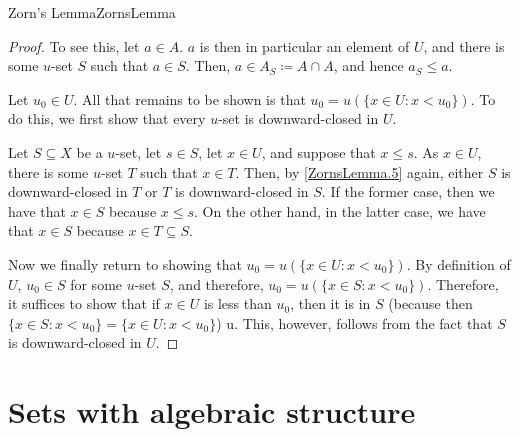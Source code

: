 \begin{thm}{Zorn's Lemma}{ZornsLemma}
\begin{proof}
To see this, let $a\in A$.  $a$ is then in particular an element of $U$, and there is some $u$-set $S$ such that $a\in S$.  Then, $a\in A_S\coloneqq A\cap A$, and hence $a_S\leq a$.

Let $u_0\in U$.  All that remains to be shown is that $u_0=u\left( \{ x\in U:x<u_0\} \right)$.  To do this, we first show  that every $u$-set is downward-closed in $U$.

Let $S\subseteq X$ be a $u$-set, let $s\in S$, let $x\in U$, and suppose that $x\leq s$.  As $x\in U$, there is some $u$-set $T$ such that $x\in T$.  Then, by \cref{ZornsLemma.5} again, either $S$ is downward-closed in $T$ or $T$ is downward-closed in $S$.  If the former case, then we have that $x\in S$ because $x\leq s$.  On the other hand, in the latter case, we have that $x\in S$ because $x\in T\subseteq S$.

Now we finally return to showing that $u_0=u\left( \{ x\in U:x<u_0\} \right)$.  By definition of $U$, $u_0\in S$ for some $u$-set $S$, and therefore, $u_0=u\left( \{ x\in S:x<u_0\} \right)$.  Therefore, it suffices to show that if $x\in U$ is less than $u_0$, then it is in $S$ (because then $\{ x\in S:x<u_0\} =\{ x\in U:x<u_0\}$)
u.  This, however, follows from the fact that $S$ is downward-closed in $U$.
\end{proof}
\end{thm}

\section{Sets with algebraic structure}

